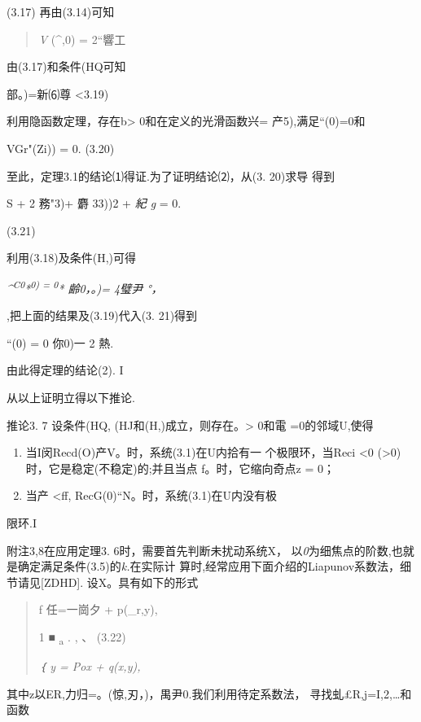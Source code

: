 \documentclass{article}
\begin{document}
(3.17) 再由(3.14)可知

\begin{quote}
\emph{V} (\^{},0) = 2``響工
\end{quote}

由(3.17)和条件(HQ可知

部。)=新⑹尊 \textless{}3.19)

利用隐函数定理，存在b\textgreater{} 0和在定义的光滑函数兴=
产5),满足``(0)=0和

VGr"(Zi)) = 0. (3.20)

至此，定理3.1的结论⑴得证.为了证明结论⑵，从(3. 20)求导 得到

S + 2 務"3)+ 麝 33))2 + \emph{紀 g} = 0.

(3.21)

利用(3.18)及条件(H,)可得

\emph{\^{}\textsuperscript{C0}*\textsuperscript{0) = 0}* 齢0，。)= 4璧尹
°，}

,把上面的结果及(3.19)代入(3. 21)得到

``(0) = 0 你0)一 2 熱.

由此得定理的结论(2). I

从以上证明立得以下推论.

推论3. 7 设条件(HQ, (HJ和(H,)成立，则存在。\textgreater{} 0和電
=0的邻域U,使得

\begin{enumerate}
\def\labelenumi{(\arabic{enumi})}
\item
  当I闵Recd(O)产V。时，系统(3.1)在U内拾有一 个极限环，当Reci
  \textless{}0 (\textgreater{}0)时，它是稳定(不稳定)的;并且当点
  f。时，它缩向奇点z = 0；
\item
  当\textbar{}产\textbar{} \textless{}ff,
  RecG(0)``N。时，系统(3.1)在U内没有极
\end{enumerate}

限环.I

附注3,8在应用定理3. 6时，需要首先判断未扰动系统X，
以\emph{0}为细焦点的阶数,也就是确定满足条件(3.5)的\emph{k.}在实际计
算时,经常应用下面介绍的Liapunov系数法，细节请见{[}ZDHD{]}.
设X。具有如下的形式

\begin{quote}
f 任=一崗夕 + p(\_r,y),

1 ■ \textsubscript{a} . , 、 (3.22)

\emph{｛ y = Pox + q(x,y),}
\end{quote}

其中z以ER,力归=。(惊,刃，)，禺尹0.我们利用待定系数法，
寻找虬£R,j=I,2,\ldots{}和函数
\end{document}
